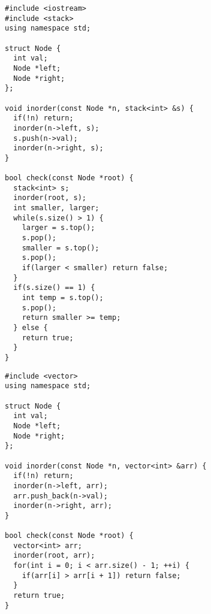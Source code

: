 \documentclass[12pt]{article}
\begin{document}
\begin{verbatim}
#include <iostream>
#include <stack>
using namespace std;

struct Node {
  int val;
  Node *left;
  Node *right;
};

void inorder(const Node *n, stack<int> &s) {
  if(!n) return;
  inorder(n->left, s);
  s.push(n->val);
  inorder(n->right, s);
}

bool check(const Node *root) {
  stack<int> s;
  inorder(root, s);
  int smaller, larger;
  while(s.size() > 1) {
    larger = s.top();
    s.pop();
    smaller = s.top();
    s.pop();
    if(larger < smaller) return false;
  }
  if(s.size() == 1) {
    int temp = s.top();
    s.pop();
    return smaller >= temp;
  } else {
    return true;
  }
}
\end{verbatim}
\newpage
\begin{verbatim}
#include <vector>
using namespace std;

struct Node {
  int val;
  Node *left;
  Node *right;
};

void inorder(const Node *n, vector<int> &arr) {
  if(!n) return;
  inorder(n->left, arr);
  arr.push_back(n->val);
  inorder(n->right, arr);
}

bool check(const Node *root) {
  vector<int> arr;
  inorder(root, arr);
  for(int i = 0; i < arr.size() - 1; ++i) {
    if(arr[i] > arr[i + 1]) return false;
  }
  return true;
}
\end{verbatim}
\end{document}
